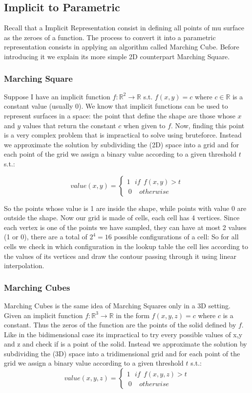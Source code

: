 \subsection{Implicit to Parametric}
Recall that a Implicit Representation consist in defining all points of mu surface as the zeroes of a function. The process to convert it into a parametric representation consists in applying an algorithm called Marching Cube. Before introducing it we explain its more simple 2D counterpart Marching Square.

\subsubsection{Marching Square}

Suppose I have an implicit function $f: \mathbb{R}^{2} \rightarrow \mathbb{R}$ s.t. $f(x,y) = c$ where $c \in \mathbb{R}$ is a constant value (usually 0). We know that implicit functions can be used to represent surfaces in a space: the point that define the shape are those whose $x$ and $y$ values that return the constant $c$ when given to $f$. Now, finding this point is a very complex problem that is impractical to solve using bruteforce. Instead we approximate the solution by subdividing the (2D) space into a grid and for each point of the grid we assign a binary value according to a given threshold $t$ s.t.:

\[
value(x, y) =
\begin{cases}
    1 \ \ \ if \ \  f(x, y) > t\\\
    0 \ \ \ \ \ otherwise
\end{cases}
\]

So the points whose value is 1 are inside the shape, while points with value 0 are outside the shape. Now our grid is made of cells, each cell has 4 vertices. Since each vertex is one of the points we have sampled, they can have at most 2 values (1 or 0), there are a total of $2^{4} = 16$ possible configurations of a cell:
So for all cells we check in which configuration in the lookup table the cell lies according to the values of its vertices and draw the contour passing through it using linear interpolation.

\subsubsection{Marching Cubes}
Marching Cubes is the same idea of Marching Squares only in a 3D setting. Given an implicit function $f: \mathbb{R}^{3} \rightarrow \mathbb{R}$ in the form $f(x,y,z) = c$ where $c$ is a constant. Thus the zeros of the function are the points of the solid defined by $f$. Like in the bidimensional case its impractical to try every possible values of x,y and z and check if is a point of the solid. Instead we approximate the solution by subdividing the (3D) space into a tridimensional grid and for each point of the grid we assign a binary value according to a given threshold $t$ s.t.:
\[
value(x, y, z) =
\begin{cases}
    1 \ \ \ if \ \  f(x, y, z) > t\\\
    0 \ \ \ \ \ otherwise
\end{cases}
\]

